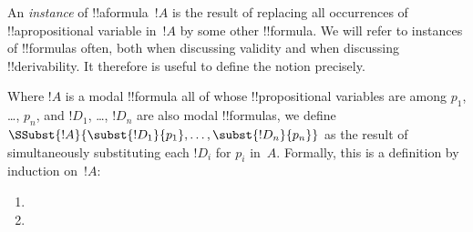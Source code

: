 \documentclass[../../../include/open-logic-section]{subfiles}
\begin{document}


An \emph{instance} of !!a{formula}~$!A$ is the result of replacing all
occurrences of !!a{propositional variable} in~$!A$ by some other
!!{formula}. We will refer to instances of !!{formula}s often, both
when discussing validity and when discussing !!{derivability}. It
therefore is useful to define the notion precisely.

\begin{defn}
  Where $!A$ is a modal !!{formula} all of whose !!{propositional
    variable}s are among $p_1$, \dots, $p_n$, and $!D_1$, \dots,
  $!D_n$ are also modal !!{formula}s, we define
  $\SSubst{!A}{\subst{!D_1}{p_1}, \dots, \subst{!D_n}{p_n}}$ as the
  result of simultaneously substituting each $!D_i$ for $p_i$
  in~$\!A$. Formally, this is a definition by induction on~$!A$:
  \begin{enumerate}
    \item {}
    \item {}
\end{enumerate}
\end{defn}
\end{document}

